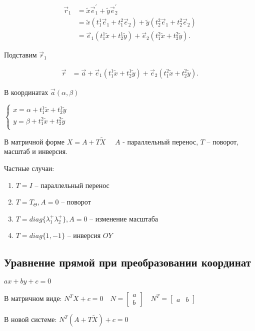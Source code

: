 \documentclass{book}
\newcommand{\p}[1]{#1^{\prime}}
\newcommand{\tl}[1]{\widetilde{#1}}
\theoremstyle{definition}
\begin{document}
\begin{align*}
\vec r_1 &= \tl x\p{\vec e_1} + \tl y\p{\vec e_2}\\& = \tl x(t_1^1\vec e_1 + t_1^2\vec e_2) + \tl y(t_2^2\vec e_1 + t_2^2\vec e_2) \\
         &= 
\vec e_1(t_1^1\tl x + t_2^1\tl y) + \vec e_2\left( t_1^2\tl x + t_2^2\tl y \right) 
.\end{align*}

Подставим $\vec r_1$

\begin{align*}
    \vec r&= \vec a + \vec e_1(t_1^1\tl x + t_2^1\tl y) + \vec e_2\left( t_1^2\tl x + t_2^2\tl y \right) 
.\end{align*}

В координатах $\vec a(\alpha, \beta)$

 $\begin{cases}
     x = \alpha + t_1^1\tl x + t_2^1\tl y\\
     y = \beta + t_1^2\tl x + t_2^2\tl y\\
 \end{cases}$

 В матричной форме $X = A + T\tl X\quad $ $A$ - параллельный перенос, $T$ -- поворот, масштаб и инверсия.

 Частные случаи:
 \begin{enumerate}
    \item $T = I$ -- параллельный перенос
    \item $T = T_{\Theta}, A = 0$ -- поворот
    \item  $T = diag\{\lambda_1^+\lambda_2^+\}, A = 0$ -- изменение масштаба
    \item $T = diag\{1,-1\}$ -- инверсия $OY$
\end{enumerate}

\subsection{Уравнение прямой при преобразовании координат}

$ax +by +c = 0 $

В матричном виде: $N^TX + c = 0\quad N = \begin{bmatrix} a\\b\end{bmatrix} \quad N^T = \begin{bmatrix} a&b \end{bmatrix} $

В новой системе: $N^T(A + T\tl X) + c = 0$
\end{document}
